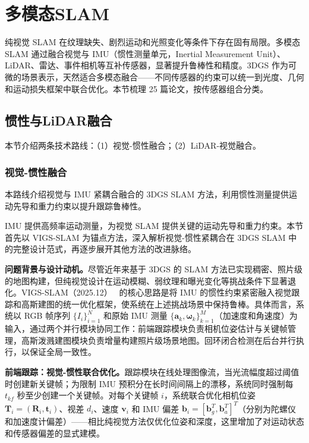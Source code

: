 \section{多模态SLAM}
\label{sec:15_3}

纯视觉 SLAM 在纹理缺失、剧烈运动和光照变化等条件下存在固有局限。多模态 SLAM 通过融合视觉与 IMU（惯性测量单元，Inertial Measurement Unit）、LiDAR、雷达、事件相机等互补传感器，显著提升鲁棒性和精度。3DGS 作为可微的场景表示，天然适合多模态融合——不同传感器的约束可以统一到光度、几何和运动损失框架中联合优化。本节梳理 25 篇论文，按传感器组合分类。

\subsection{惯性与LiDAR融合}
\label{ss:15_4}

本节介绍两条技术路线：（1）视觉-惯性融合；（2）LiDAR-视觉融合。

\subsubsection{视觉-惯性融合}

本路线介绍视觉与 IMU 紧耦合融合的 3DGS SLAM 方法，利用惯性测量提供运动先导和重力约束以提升跟踪鲁棒性。

IMU 提供高频率运动测量，为视觉 SLAM 提供关键的运动先导和重力约束。本节首先以 VIGS-SLAM 为锚点方法，深入解析视觉-惯性紧耦合在 3DGS SLAM 中的完整设计范式，再逐步展开其他方法的改进脉络。

\textbf{问题背景与设计动机。}尽管近年来基于 3DGS 的 SLAM 方法已实现稠密、照片级的地图构建，但纯视觉设计在运动模糊、弱纹理和曝光变化等挑战条件下显著退化。VIGS-SLAM（2025.12）~\cite{2512_02293} 的核心思路是将 IMU 的惯性约束紧密融入视觉跟踪和高斯建图的统一优化框架，使系统在上述挑战场景中保持鲁棒。具体而言，系统以 RGB 帧序列 $\{I_i\}_{i=1}^N$ 和原始 IMU 测量 $\{\mathbf{a}_k, \boldsymbol{\omega}_k\}_{k=1}^M$（加速度和角速度）为输入，通过两个并行模块协同工作：前端跟踪模块负责相机位姿估计与关键帧管理，高斯泼溅建图模块负责增量构建照片级场景地图。回环闭合检测在后台并行执行，以保证全局一致性。

\textbf{前端跟踪：视觉-惯性联合优化。}跟踪模块在线处理图像流，当光流幅度超过阈值时创建新关键帧；为限制 IMU 预积分在长时间间隔上的漂移，系统同时强制每 $t_{kf}$ 秒至少创建一个关键帧。对每个关键帧 $i$，系统联合优化相机位姿 $\mathbf{T}_i = (\mathbf{R}_i, \mathbf{t}_i)$、视差 $d_i$、速度 $\mathbf{v}_i$ 和 IMU 偏差 $\mathbf{b}_i = [\mathbf{b}_g^T, \mathbf{b}_a^T]^T$（分别为陀螺仪和加速度计偏差）——相比纯视觉方法仅优化位姿和深度，这里增加了对运动状态和传感器偏差的显式建模。

